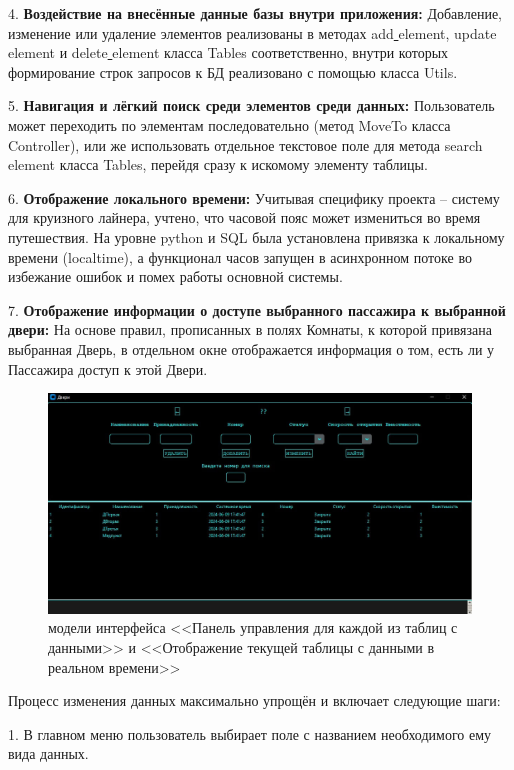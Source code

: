 4. \textbf{Воздействие на внесённые данные базы внутри приложения:} Добавление, изменение или удаление элементов реализованы в методах add\underline{ }element, update\underline{ }element и delete\underline{ }element класса Tables соответственно, внутри которых формирование строк запросов к БД реализовано с помощью класса Utils.

5. \textbf{Навигация и лёгкий поиск среди элементов среди данных:} Пользователь может переходить по элементам последовательно (метод MoveTo класса Controller), или же использовать отдельное текстовое поле для метода search\underline{ }element класса Tables, перейдя сразу к искомому элементу таблицы.

6. \textbf{Отображение локального времени:} Учитывая специфику проекта -- систему для круизного лайнера, учтено, что часовой пояс может измениться во время путешествия. На уровне python и SQL была установлена привязка к локальному времени (localtime), а функционал часов запущен в асинхронном потоке во избежание ошибок и помех работы основной системы.

7. \textbf{Отображение информации о доступе выбранного пассажира к выбранной двери:} На основе правил, прописанных в полях Комнаты, к которой привязана выбранная Дверь, в отдельном окне отображается информация о том, есть ли у Пассажира доступ к этой Двери.

\begin{figure} [ht]
	\centering
	\includegraphics[width=1\linewidth]{images/Example2}
	\caption{модели интерфейса <<Панель управления для каждой из таблиц с данными>> и <<Отображение текущей таблицы с данными в реальном времени>>}
	\label{fig:example2}
\end{figure}

Процесс изменения данных максимально упрощён и включает следующие шаги:

1. В главном меню пользователь выбирает поле с названием необходимого ему вида данных.

